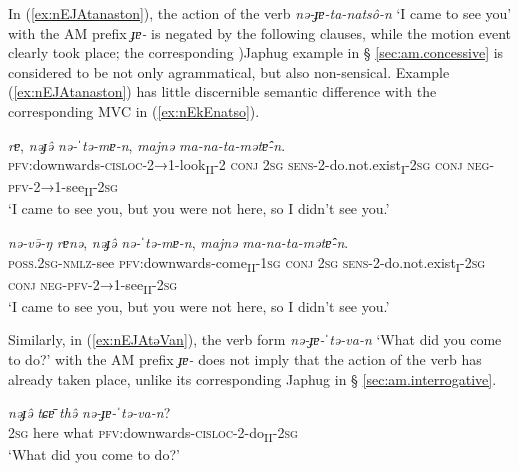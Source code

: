 \documentclass[oneside,a4paper,11pt]{article}
\newcommand{\ipa}[1]{{\phon\textit{#1}}}
\newcommand{\sens}[1]{‘#1’}
\begin{document}
In (\ref{ex:nEJAtanaston}), the action of the verb \ipa{nə-ɟɐ-ta-natsô-n}  `I came to see you' with the AM prefix \ipa{ɟɐ-} is negated by the following clauses, while the motion event clearly took place; the corresponding )Japhug example in § \ref{sec:am.concessive} is considered to be not only agrammatical, but also non-sensical. Example (\ref{ex:nEJAtanaston}) has little discernible semantic difference with the corresponding MVC in (\ref{ex:nEkEnatso}).
 

\begin{exe}
\ex \label{ex:nEJAtanaston}
\gll \ipa{nə-ɟɐ-ta-natsô-n} \ipa{rɐ}, \ipa{nəɟə̂} \ipa{nə-ˈtə-mɐ-n}, \ipa{majnə} \ipa{ma-na-ta-mətɐ̂-n}.\\
\textsc{pfv}:downwards-\textsc{cisloc}-2→1-look\textsubscript{II}-2 \textsc{conj} \textsc{2sg} \textsc{sens}-2-do.not.exist\textsubscript{I}-\textsc{2sg} \textsc{conj} \textsc{neg}-\textsc{pfv}-2→1-see\textsubscript{II}-\textsc{2sg}\\
\glt  \sens{I came to see you, but you were not here, so I didn't see you.}
\end{exe}

\begin{exe}
\ex  \label{ex:nEkEnatso}
\gll \ipa{nə-kə-natsō} \ipa{nə-və̄-ŋ} \ipa{rɐnə}, \ipa{nəɟə̂} \ipa{nə-ˈtə-mɐ-n}, \ipa{majnə} \ipa{ma-na-ta-mətɐ̂-n}.\\
\textsc{poss.2sg}-\textsc{nmlz}-see \textsc{pfv}:downwards-come\textsubscript{II}-\textsc{1sg} \textsc{conj} \textsc{2sg} \textsc{sens}-2-do.not.exist\textsubscript{I}-\textsc{2sg} \textsc{conj} \textsc{neg}-\textsc{pfv}-2→1-see\textsubscript{II}-\textsc{2sg}\\
\glt  \sens{I came to see you, but you were not here, so I didn't see you.}
\end{exe}

Similarly, in (\ref{ex:nEJAtəVan}), the verb form  \ipa{nə-ɟɐ-ˈtə-va-n}  \sens{What did you come to do?} with the AM prefix \ipa{ɟɐ-} does not imply that the action of the verb has already taken place, unlike its corresponding Japhug in § \ref{sec:am.interrogative}.

 

\begin{exe}
\ex \label{ex:nEJAtəVan}
\gll
\ipa{nəɟə̂} \ipa{tɕɐ̄} \ipa{thə̂} \ipa{nə-ɟɐ-ˈtə-va-n}? \\
\textsc{2sg} here what  \textsc{pfv}:downwards-\textsc{cisloc}-2-do\textsubscript{II}-\textsc{2sg} \\
\glt  \sens{What did you come to do?}
\end{exe}
\end{document}
